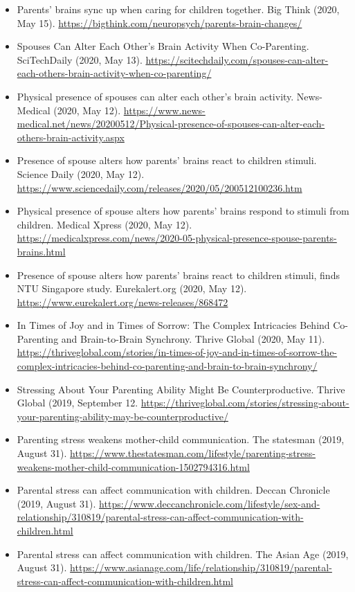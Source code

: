 \documentclass[10pt,a4paper]{altacv}
\begin{document}
\begin{fullwidth}
\begin{itemize}
			\item Parents’ brains sync up when caring for children together. Big Think (2020, May 15). \url{https://bigthink.com/neuropsych/parents-brain-changes/}
			\item Spouses Can Alter Each Other’s Brain Activity When Co-Parenting. SciTechDaily (2020, May 13). \url{https://scitechdaily.com/spouses-can-alter-each-others-brain-activity-when-co-parenting/}
			\item Physical presence of spouses can alter each other's brain activity. News-Medical (2020, May 12). \url{https://www.news-medical.net/news/20200512/Physical-presence-of-spouses-can-alter-each-others-brain-activity.aspx}
			\item Presence of spouse alters how parents' brains react to children stimuli. Science Daily (2020, May 12). \url{https://www.sciencedaily.com/releases/2020/05/200512100236.htm}
			\item Physical presence of spouse alters how parents' brains respond to stimuli from children. Medical Xpress (2020, May 12). \url{https://medicalxpress.com/news/2020-05-physical-presence-spouse-parents-brains.html}
			\item Presence of spouse alters how parents' brains react to children stimuli, finds NTU Singapore study. Eurekalert.org (2020, May 12). \url{https://www.eurekalert.org/news-releases/868472}
			\item In Times of Joy and in Times of Sorrow: The Complex Intricacies Behind Co-Parenting and Brain-to-Brain Synchrony. Thrive Global (2020, May 11). \url{https://thriveglobal.com/stories/in-times-of-joy-and-in-times-of-sorrow-the-complex-intricacies-behind-co-parenting-and-brain-to-brain-synchrony/}
			\item Stressing About Your Parenting Ability Might Be Counterproductive. Thrive Global (2019, September 12. \url{https://thriveglobal.com/stories/stressing-about-your-parenting-ability-may-be-counterproductive/}
			\item Parenting stress weakens mother-child communication. The statesman (2019, August 31). \url{https://www.thestatesman.com/lifestyle/parenting-stress-weakens-mother-child-communication-1502794316.html}
			\item Parental stress can affect communication with children. Deccan Chronicle (2019, August 31). \url{https://www.deccanchronicle.com/lifestyle/sex-and-relationship/310819/parental-stress-can-affect-communication-with-children.html}
			\item Parental stress can affect communication with children. The Asian Age (2019, August 31). \url{https://www.asianage.com/life/relationship/310819/parental-stress-can-affect-communication-with-children.html}

\end{itemize}
\end{fullwidth}
\end{document}
